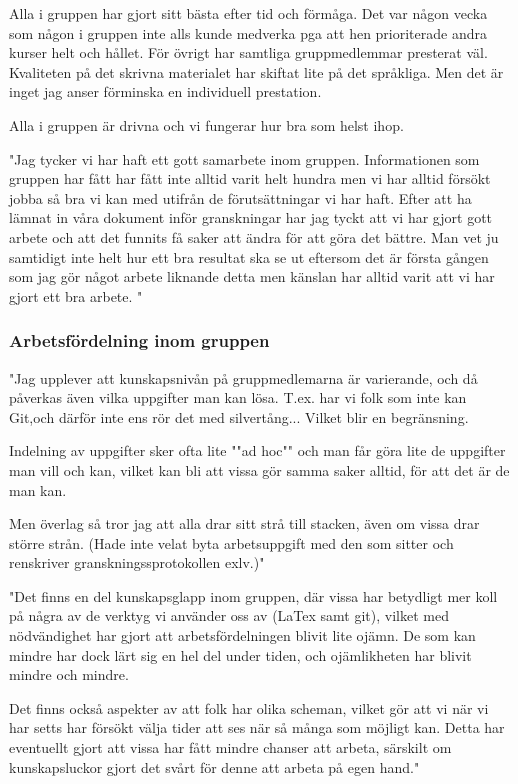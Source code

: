 \documentclass[a4paper]{article}
\begin{document}
Alla i gruppen har gjort sitt bästa efter tid och förmåga. Det var någon vecka som någon i gruppen inte alls kunde medverka pga att hen prioriterade andra kurser helt och hållet. För övrigt har samtliga gruppmedlemmar presterat väl. Kvaliteten på det skrivna materialet har skiftat lite på det språkliga. Men det är inget jag anser förminska en individuell prestation. 

Alla i gruppen är drivna och vi fungerar hur bra som helst ihop. 

"Jag tycker vi har haft ett gott samarbete inom gruppen. Informationen som gruppen har fått har fått inte alltid varit helt hundra men vi har alltid försökt jobba så bra vi kan med utifrån de förutsättningar vi har haft. Efter att ha lämnat in våra dokument inför granskningar har jag tyckt att vi har gjort gott arbete och att det funnits få saker att ändra för att göra det bättre. Man vet ju samtidigt inte helt hur ett bra resultat ska se ut eftersom det är första gången som jag gör något arbete liknande detta men känslan har alltid varit att vi har gjort ett bra arbete.
"

\subsubsection{Arbetsfördelning inom gruppen}
"Jag upplever att kunskapsnivån på gruppmedlemarna är varierande, och då påverkas även vilka uppgifter man kan lösa. T.ex. har vi folk som inte kan Git,och därför inte ens rör det med silvertång... Vilket blir en begränsning.

Indelning av uppgifter sker ofta lite ""ad hoc"" och man får göra lite de uppgifter man vill och kan, vilket kan bli att vissa gör samma saker alltid, för att det är de man kan.

Men överlag så tror jag att alla drar sitt strå till stacken, även om vissa drar större strån. (Hade inte velat byta arbetsuppgift med den som sitter och renskriver granskningssprotokollen exlv.)"

"Det finns en del kunskapsglapp inom gruppen, där vissa har betydligt mer koll på några av de verktyg vi använder oss av (LaTex samt git), vilket med nödvändighet har gjort att arbetsfördelningen blivit lite ojämn. De som kan mindre har dock lärt sig en hel del under tiden, och ojämlikheten har blivit mindre och mindre.

Det finns också aspekter av att folk har olika scheman, vilket gör att vi när vi har setts har försökt välja tider att ses när så många som möjligt kan. Detta har eventuellt gjort att vissa har fått mindre chanser att arbeta, särskilt om kunskapsluckor gjort det svårt för denne att arbeta på egen hand."
\end{document}
